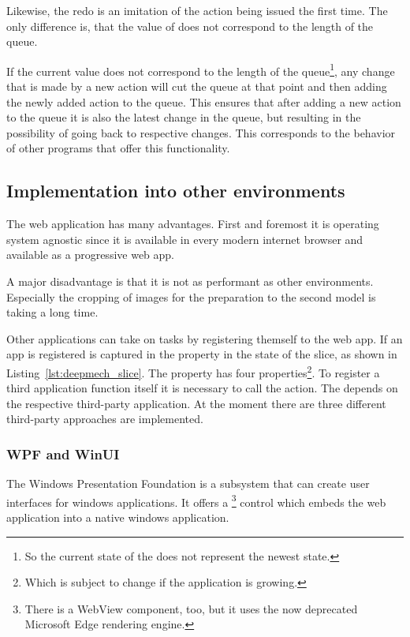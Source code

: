 Likewise, the redo is an imitation of the action being issued the first time.
The only difference is, that the value of  does not correspond to the length of the queue.

If the current  value does not correspond to the length of the queue\footnote{So the current state of the  does not represent the newest state.}, any change that is made by a new action will cut the queue at that point and then adding the newly added action to the queue.
This ensures that after adding a new action to the queue it is also the latest change in the queue, but resulting in the possibility of going back to respective changes.
This corresponds to the behavior of other programs that offer this functionality.


\subsection{Implementation into other environments}

The web application has many advantages.
First and foremost it is operating system agnostic since it is available in every modern internet browser and available as a progressive web app. %

A major disadvantage is that it is not as performant as other environments.
Especially the cropping of images for the preparation to the second model is taking a long time.

Other applications can take on tasks by registering themself to the web app.
If an app is registered is captured in the  property in the state of the  slice, as shown in Listing~\ref{lst:deepmech_slice}.
The  property has four properties\footnote{Which is subject to change if the application is growing.}.
To register a third application function itself it is necessary to call the  action.
The  depends on the respective third-party application.
At the moment there are three different third-party approaches are implemented.

\subsubsection{WPF and WinUI}

The Windows Presentation Foundation is a subsystem that can create user interfaces for windows applications.
It offers a \footnote{There is a WebView component, too, but it uses the now deprecated Microsoft Edge rendering engine.} control which embeds the web application into a native windows application. %


